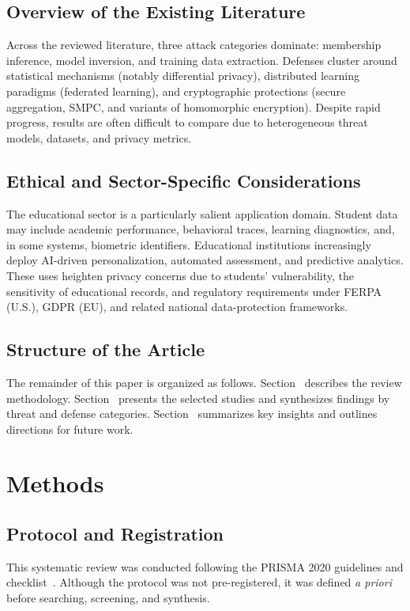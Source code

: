 \documentclass[conference]{IEEEtran}
\begin{document}
\subsection{Overview of the Existing Literature}
Across the reviewed literature, three attack categories dominate: membership inference, model inversion, and training data extraction. Defenses cluster around statistical mechanisms (notably differential privacy), distributed learning paradigms (federated learning), and cryptographic protections (secure aggregation, SMPC, and variants of homomorphic encryption). Despite rapid progress, results are often difficult to compare due to heterogeneous threat models, datasets, and privacy metrics.

\subsection{Ethical and Sector-Specific Considerations}
The educational sector is a particularly salient application domain. Student data may include academic performance, behavioral traces, learning diagnostics, and, in some systems, biometric identifiers. Educational institutions increasingly deploy AI-driven personalization, automated assessment, and predictive analytics. These uses heighten privacy concerns due to students' vulnerability, the sensitivity of educational records, and regulatory requirements under FERPA (U.S.), GDPR (EU), and related national data-protection frameworks.

\subsection{Structure of the Article}
The remainder of this paper is organized as follows. Section~ describes the review methodology. Section~ presents the selected studies and synthesizes findings by threat and defense categories. Section~ summarizes key insights and outlines directions for future work.

\section{Methods}
\label{sec:Methods}

\subsection{Protocol and Registration}
This systematic review was conducted following the PRISMA 2020 guidelines and checklist~\cite{prisma2020}. Although the protocol was not pre-registered, it was defined \textit{a priori} before searching, screening, and synthesis.
\end{document}
